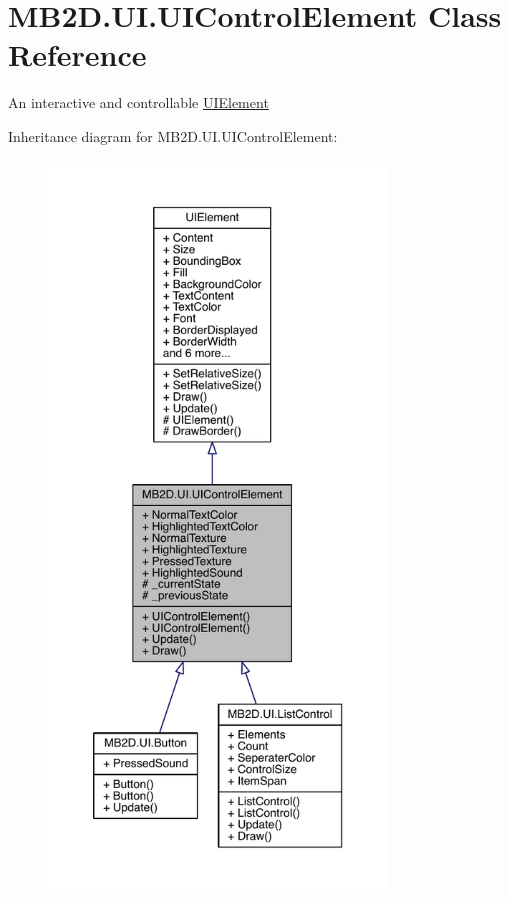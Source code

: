 \hypertarget{class_m_b2_d_1_1_u_i_1_1_u_i_control_element}{}\section{M\+B2\+D.\+U\+I.\+U\+I\+Control\+Element Class Reference}
\label{class_m_b2_d_1_1_u_i_1_1_u_i_control_element}


An interactive and controllable \hyperlink{class_m_b2_d_1_1_u_i_1_1_u_i_element}{U\+I\+Element}  




Inheritance diagram for M\+B2\+D.\+U\+I.\+U\+I\+Control\+Element\+:
\nopagebreak
\begin{figure}[H]
\begin{center}
\leavevmode
\includegraphics[height=550pt]{class_m_b2_d_1_1_u_i_1_1_u_i_control_element__inherit__graph}
\end{center}
\end{figure}



